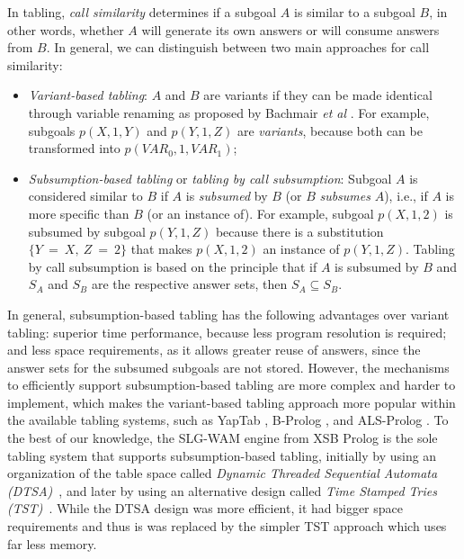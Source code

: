 In tabling, \emph{call similarity} determines if a subgoal $A$ is similar to a subgoal $B$,
in other words, whether $A$ will generate its own answers or will consume answers from $B$. In general,
we can distinguish between two main approaches for call similarity:

\begin{itemize}
   \item \emph{Variant-based tabling}: $A$ and $B$ are variants if they can be made identical
   through variable renaming as proposed by Bachmair \textit{et al} \cite{Bachmair-93}.
   For example, subgoals $p(X,1,Y)$ and $p(Y,1,Z)$ are \emph{variants},
   because both can be transformed into $p(VAR_0,1,VAR_1)$;
   \item \emph{Subsumption-based tabling} or \emph{tabling by call subsumption}: Subgoal $A$ is considered similar
   to $B$ if $A$ is \emph{subsumed} by $B$ (or $B$ \emph{subsumes} $A$), i.e., if $A$ is more specific than $B$
   (or an instance of). For example, subgoal $p(X,1,2)$ is subsumed by subgoal $p(Y,1,Z)$ because there
   is a substitution $\{Y~=~X,~Z~=~2\}$ that makes $p(X,1,2)$ an instance of $p(Y,1,Z)$. Tabling by call
   subsumption is based on the principle that if $A$ is subsumed by $B$ and $S_A$ and $S_B$ are the respective
   answer sets, then $S_A \subseteq S_B$.
\end{itemize}

In general, subsumption-based tabling has the following advantages over variant tabling:
superior time performance, because less program resolution is required; and less space requirements,
as it allows greater reuse of answers, since the answer sets for the subsumed subgoals are not stored.
However, the mechanisms to efficiently support subsumption-based tabling are more complex and harder to
implement, which makes the variant-based tabling approach more popular within the available tabling systems,
such as YapTab \cite{Rocha-00a}, B-Prolog \cite{Zhou-00}, and ALS-Prolog \cite{Guo-01}.
To the best of our knowledge, the SLG-WAM \cite{Sagonas-98} engine from XSB Prolog is the sole tabling system that supports
subsumption-based tabling, initially by using an organization of the table space called
\emph{Dynamic Threaded Sequential Automata (DTSA)}~\cite{Rao-96}, and later by using an alternative design called
\emph{Time Stamped Tries (TST)}~\cite{Johnson-99}.
While the DTSA design was more efficient, it had bigger space requirements and thus is was replaced by the simpler
TST approach which uses far less memory.

